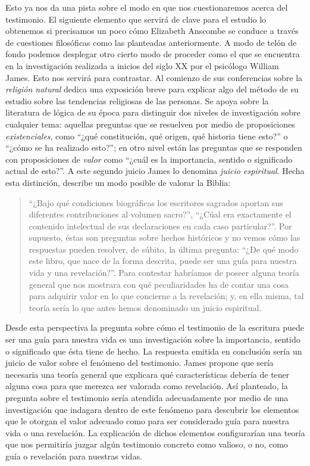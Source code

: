 Esto ya nos da una pista sobre el modo en que nos cuestionaremos acerca del
testimonio. El siguiente elemento que servirá de clave para el estudio lo
obtenemos si precisamos un poco cómo Elizabeth Anscombe se conduce a través de
cuestiones filosóficas como las planteadas anteriormente. A modo de telón de
fondo podemos desplegar otro cierto modo de proceder como el que se encuentra en
la investigación realizada a inicios del siglo XX por el psicólogo William
James. Esto nos servirá para contrastar. Al comienzo de sus conferencias sobre
la \emph{religión natural} dedica una exposición breve para explicar algo del
método de su estudio sobre las tendencias religiosas de las personas. Se apoya
sobre la literatura de lógica de su época para distinguir dos niveles de
investigación sobre cualquier tema: aquellas preguntas que se resuelven por
medio de proposiciones \emph{existenciales}, como \enquote{¿qué constitución,
  qué origen, qué historia tiene esto?} o \enquote{¿cómo se ha realizado esto?};
en otro nivel están las preguntas que se responden con proposiciones de
\emph{valor} como \enquote{¿cuál es la importancia, sentido o significado actual
  de esto?}. A este segundo juicio James lo denomina \emph{juicio espiritual}.
Hecha esta distinción, describe un modo posible de valorar la Biblia:

\blockquote[{\cite[27]{james2002variedades}}]{\enquote{¿Bajo qué condiciones
    biográficas los escritores sagrados aportan sus diferentes contribuciones al
    volumen sacro?}, \enquote{¿Cúal era exactamente el contenido intelectual de
    sus declaraciones en cada caso particular?}. Por supuesto, éstas son
  preguntas sobre hechos históricos y no vemos cómo las respuestas pueden
  resolver, de súbito, la última pregunta: \enquote{¿De qué modo este libro, que
    nace de la forma descrita, puede ser una guía para nuestra vida y una
    revelación?}. Para contestar habríamos de poseer alguna teoría general que
  nos mostrara con qué peculiaridades ha de contar una cosa para adquirir valor
  en lo que concierne a la revelación; y, en ella misma, tal teoría sería lo que
  antes hemos denominado un juicio espiritual.}

Desde esta perspectiva la pregunta sobre cómo el testimonio de la escritura
puede ser una guía para nuestra vida es una investigación sobre la importancia,
sentido o significado que ésta tiene de hecho. La respuesta emitida en
conclusión sería un juicio de valor sobre el fenómeno del testimonio. James
propone que sería necesaria una teoría general que explicara qué características
debería de tener alguna cosa para que merezca ser valorada como revelación. Así
planteado, la pregunta sobre el testimonio sería atendida adecuadamente por
medio de una investigación que indagara dentro de este fenómeno para descubrir
los elementos que le otorgan el valor adecuado como para ser considerado guía
para nuestra vida o una revelación. La explicación de dichos elementos
configurarían una teoría que nos permitiría juzgar algún testimonio concreto
como valioso, o no, como guía o revelación para nuestras vidas.

